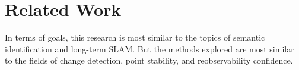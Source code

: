 \section{Related Work}
\label{sec:related_work}

In terms of goals, this research is most similar to the topics of semantic identification and long-term SLAM. But the methods explored are most similar to the fields of change detection, point stability, and reobservability confidence.

% 